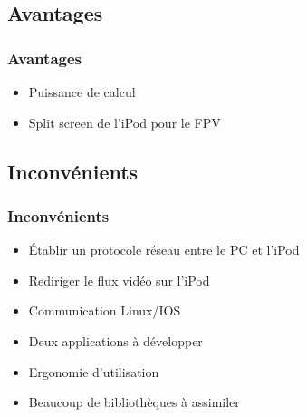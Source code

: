 \documentclass[11pt]{beamer}
\begin{document}
\subsection{Avantages}
\begin{frame}
\frametitle{Avantages}

\begin{itemize}
\item Puissance de calcul 
    
\item Split screen de l'iPod pour le FPV 
\end{itemize}
\end{frame}

\subsection{Inconvénients}
\begin{frame}
\frametitle{Inconvénients}
\begin{itemize}

\item Établir un protocole réseau entre le PC et l'iPod 
    
\item Rediriger le flux vidéo sur l'iPod 

\item Communication Linux/IOS 

\item Deux applications à développer 

\item Ergonomie d'utilisation 

\item Beaucoup de bibliothèques à assimiler 
\end{itemize}

\end{frame}
\end{document}
